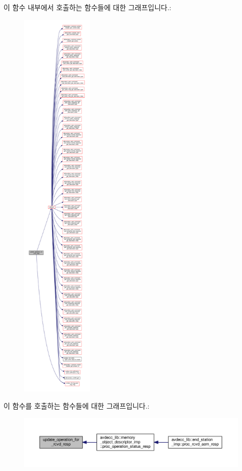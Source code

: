 이 함수 내부에서 호출하는 함수들에 대한 그래프입니다.\+:
\nopagebreak
\begin{figure}[H]
\begin{center}
\leavevmode
\includegraphics[height=550pt]{classavdecc__lib_1_1aecp__controller__state__machine_a862f2ed40a94cb35626166286b0fa151_cgraph}
\end{center}
\end{figure}




이 함수를 호출하는 함수들에 대한 그래프입니다.\+:
\nopagebreak
\begin{figure}[H]
\begin{center}
\leavevmode
\includegraphics[width=350pt]{classavdecc__lib_1_1aecp__controller__state__machine_a862f2ed40a94cb35626166286b0fa151_icgraph}
\end{center}
\end{figure}




